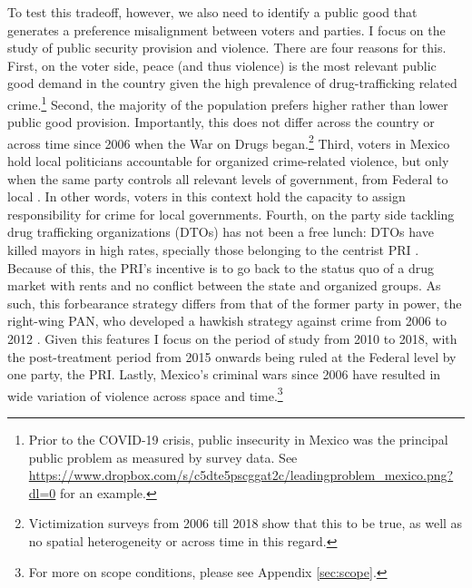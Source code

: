 \documentclass[12pt]{amsart}
\numberwithin{equation}{section}
\theoremstyle{definition}
\theoremstyle{definition}
\theoremstyle{definition}
\begin{document}
To test this tradeoff, however, we also need to identify a public good that generates a preference misalignment between voters and parties. I focus on the study of public security provision and violence. There are four reasons for this. First, on the voter side, peace (and thus violence) is the most relevant public good demand in the country given the high prevalence of drug-trafficking related crime.\footnote{Prior to the COVID-19 crisis, public insecurity in Mexico was the principal public problem as measured by survey data. See \url{https://www.dropbox.com/s/c5dte5pscggat2c/leadingproblem_mexico.png?dl=0} for an example.} Second, the majority of the population prefers higher rather than lower public good provision. Importantly, this does not differ across the country or across time since 2006 when the War on Drugs began.\footnote{Victimization surveys from 2006 till 2018 show that this to be true, as well as no spatial heterogeneity or across time in this regard.} Third, voters in Mexico hold local politicians accountable for organized crime-related violence, but only when the same party controls all relevant levels of government, from Federal to local \citep{ley_2017}. In other words, voters in this context hold the capacity to assign responsibility for crime for local governments. Fourth, on the party side tackling drug trafficking organizations (DTOs) has not been a free lunch: DTOs have killed mayors in high rates, specially those belonging to the centrist PRI \citep{ley_trejo_2020}. Because of this, the PRI's incentive is to go back to the status quo of a drug market with rents and no conflict between the state and organized groups. As such, this forbearance strategy differs from that of the former party in power, the right-wing PAN, who developed a hawkish strategy against crime from 2006 to 2012 \citep{dell_2015}. Given this features I focus on the period of study from 2010 to 2018, with the post-treatment period from 2015 onwards being ruled at the Federal level by one party, the PRI. Lastly, Mexico's criminal wars since 2006 have resulted in wide variation of violence across space and time.\footnote{For more on scope conditions, please see Appendix \ref{sec:scope}.}




 
\end{document}
